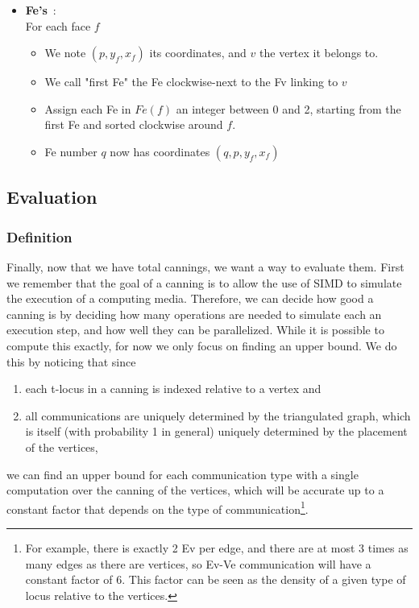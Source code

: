 \documentclass{report}
\begin{document}
\begin{itemize}
	\item \textbf{Fe's}~:\\
	For each face $f$ 
	\begin{itemize}[noitemsep, nosep, label=-]
		\item We note $(p, y_f, x_f)$ its coordinates, and $v$ the vertex it belongs to.
		\item We call "first Fe" the Fe clockwise-next to the Fv linking to $v$
		\item Assign each Fe in $Fe(f)$ an integer between 0 and 2, starting from the first Fe and sorted clockwise around $f$.
		\item Fe number $q$ now has coordinates $(q, p, y_f, x_f)$
	\end{itemize}
\end{itemize}

\subsection{Evaluation}

\subsubsection{Definition}
\label{eval_def}

\newcommand{\footnoteConstantFactor}{
	For example, there is exactly 2 Ev per edge, and there are at most 3 times as many edges as there are vertices, so Ev-Ve communication will have a constant factor of 6. This factor can be seen as the density of a given type of locus relative to the vertices.
}

Finally, now that we have total cannings, we want a way to evaluate them. First we remember that the goal of a canning is to allow the use of SIMD to simulate the execution of a computing media. Therefore, we can decide how good a canning is by deciding how many operations are needed to simulate each an execution step, and how well they can be parallelized. While it is possible to compute this exactly, for now we only focus on finding an upper bound. We do this by noticing that since
\begin{enumerate}
	\item each t-locus in a canning is indexed relative to a vertex and
	\item all communications are uniquely determined by the triangulated graph, which is itself (with probability 1 in general) uniquely determined by the placement of the vertices,
\end{enumerate}
we can find an upper bound for each communication type with a single computation over the canning of the vertices, which will be accurate up to a constant factor that depends on the type of communication\footnote{\footnoteConstantFactor}.
\end{document}
